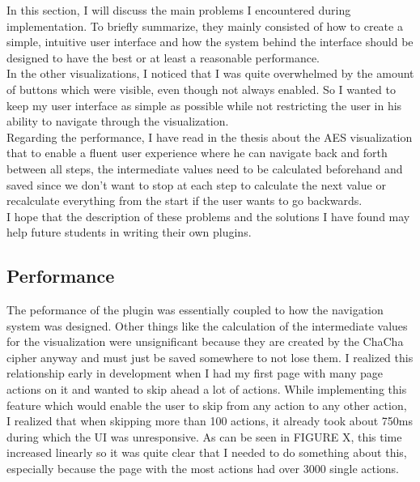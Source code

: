 In this section, I will discuss the main problems I encountered during implementation. To briefly summarize, they mainly consisted of how to create a simple, intuitive user interface and how the system behind the interface should be designed to have the best or at least a reasonable performance. \\ In the other visualizations, I noticed that I was quite overwhelmed by the amount of buttons which were visible, even though not always enabled. So I wanted to keep my user interface as simple as possible while not restricting the user in his ability to navigate through the visualization. \\ Regarding the performance, I have read in the thesis about the AES visualization that to enable a fluent user experience where he can navigate back and forth between all steps, the intermediate values need to be calculated beforehand and saved since we don't want to stop at each step to calculate the next value or recalculate everything from the start if the user wants to go backwards.\\
I hope that the description of these problems and the solutions I have found may help future students in writing their own plugins.

\subsection{Performance}

The peformance of the plugin was essentially coupled to how the navigation system was designed. Other things like the calculation of the intermediate values for the visualization were unsignificant because they are created by the ChaCha cipher anyway and must just be saved somewhere to not lose them. I realized this relationship early in development when I had my first page with many page actions on it and wanted to skip ahead a lot of actions. While implementing this feature which would enable the user to skip from any action to any other action, I realized that when skipping more than 100 actions, it already took about 750ms during which the UI was unresponsive. As can be seen in FIGURE X, this time increased linearly so it was quite clear that I needed to do something about this, especially because the page with the most actions had over 3000 single actions.

\par

